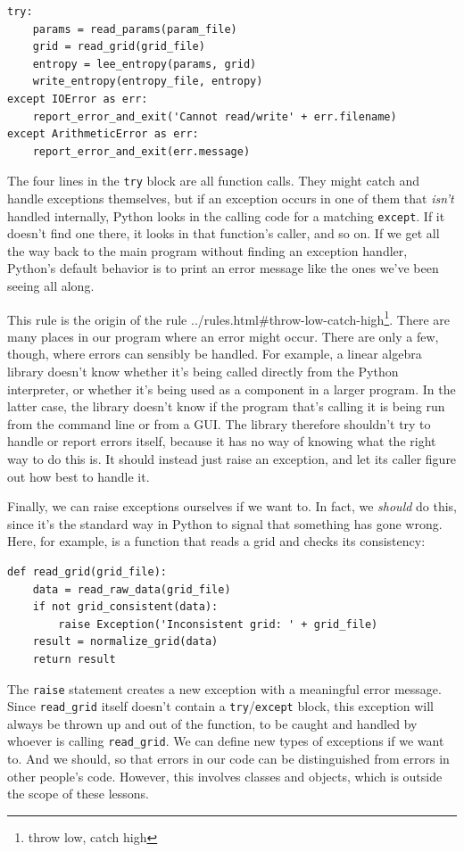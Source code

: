 \documentclass[]{book}
\newcommand{\urlfoot}[2]{{#1}\footnote{#2}}
\begin{document}
\begin{verbatim}
try:
    params = read_params(param_file)
    grid = read_grid(grid_file)
    entropy = lee_entropy(params, grid)
    write_entropy(entropy_file, entropy)
except IOError as err:
    report_error_and_exit('Cannot read/write' + err.filename)
except ArithmeticError as err:
    report_error_and_exit(err.message)
\end{verbatim}

The four lines in the \texttt{try} block are all function calls. They
might catch and handle exceptions themselves, but if an exception occurs
in one of them that \emph{isn't} handled internally, Python looks in the
calling code for a matching \texttt{except}. If it doesn't find one
there, it looks in that function's caller, and so on. If we get all the
way back to the main program without finding an exception handler,
Python's default behavior is to print an error message like the ones
we've been seeing all along.

This rule is the origin of the rule
\urlfoot{../rules.html\#throw-low-catch-high}{throw low, catch high}. There
are many places in our program where an error might occur. There are
only a few, though, where errors can sensibly be handled. For example, a
linear algebra library doesn't know whether it's being called directly
from the Python interpreter, or whether it's being used as a component
in a larger program. In the latter case, the library doesn't know if the
program that's calling it is being run from the command line or from a
GUI. The library therefore shouldn't try to handle or report errors
itself, because it has no way of knowing what the right way to do this
is. It should instead just raise an exception, and let its caller figure
out how best to handle it.

Finally, we can raise exceptions ourselves if we want to. In fact, we
\emph{should} do this, since it's the standard way in Python to signal
that something has gone wrong. Here, for example, is a function that
reads a grid and checks its consistency:

\begin{verbatim}
def read_grid(grid_file):
    data = read_raw_data(grid_file)
    if not grid_consistent(data):
        raise Exception('Inconsistent grid: ' + grid_file)
    result = normalize_grid(data)
    return result
\end{verbatim}

The \texttt{raise} statement creates a new exception with a meaningful
error message. Since \texttt{read\_grid} itself doesn't contain a
\texttt{try}/\texttt{except} block, this exception will always be thrown
up and out of the function, to be caught and handled by whoever is
calling \texttt{read\_grid}. We can define new types of exceptions if we
want to. And we should, so that errors in our code can be distinguished
from errors in other people's code. However, this involves classes and
objects, which is outside the scope of these lessons.
\end{document}
